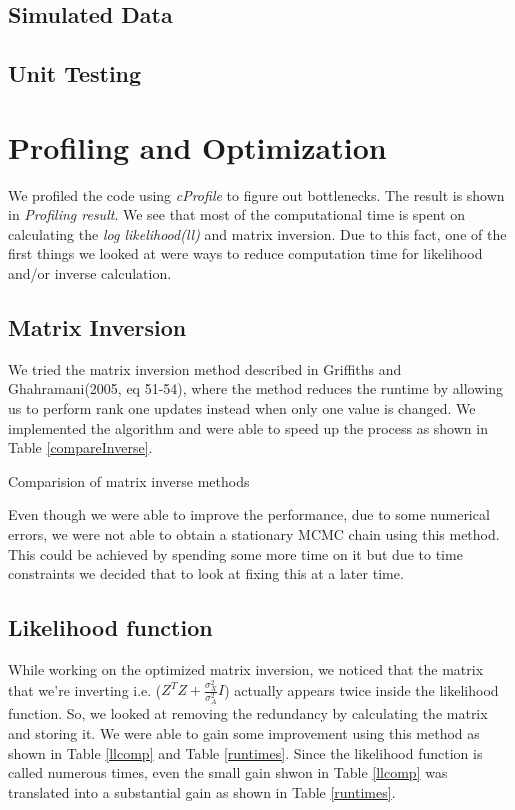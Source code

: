\documentclass{article}
\begin{document}
\subsection{Simulated Data}


\subsection{Unit Testing}


\section{Profiling and Optimization}
We profiled the code using \textit{cProfile} to figure out bottlenecks. The result is shown in \textit{Profiling result}. We see that most of the computational time is spent on calculating the \textit{log likelihood(ll)}  and matrix inversion. Due to this fact, one of the first things we looked at were ways to reduce computation time for likelihood and/or inverse calculation.\\


\subsection{Matrix Inversion}
We tried the matrix inversion method described in Griffiths and Ghahramani(2005, eq 51-54), where the method reduces the runtime by allowing us to perform rank one updates instead when only one value is changed. We implemented the algorithm and were able to speed up the process as shown in Table \ref{compareInverse}.

\begin{table}[ht]
\centering
\caption{Comparision of matrix inverse methods \label{compareInverse}}

\end{table}

Even though we were able to improve the performance, due to some numerical errors, we were not able to obtain a stationary MCMC chain using this method. This could be achieved by spending some more time on it but due to time constraints we decided that to look at fixing this at a later time.\\

\subsection{Likelihood function}
While working on the optimized matrix inversion, we noticed that the matrix that we're inverting i.e. ($Z^TZ+\frac{\sigma_X^2}{\sigma_A^2}I$) actually appears twice inside the likelihood function. So, we looked at removing the redundancy by calculating the matrix and storing it. We were able to gain some improvement using this method as shown in Table \ref{llcomp} and Table \ref{runtimes}. Since the likelihood function is called numerous times, even the small gain shwon in Table \ref{llcomp} was translated into a substantial gain as shown in Table \ref{runtimes}.\\
\end{document}
